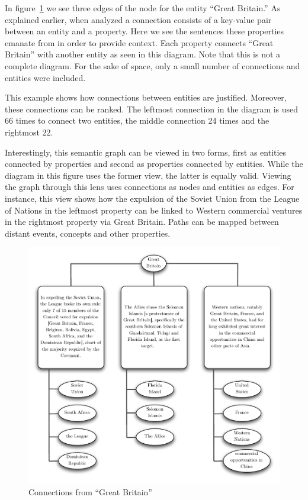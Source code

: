In figure~\ref{fig:gb-connections} we see three edges of the node for the entity ``Great Britain.''  As explained earlier, when analyzed a connection consists of a key-value pair between an entity and a property.  Here we see the sentences these properties emanate from in order to provide context.  Each property connects ``Great Britain'' with another entity as seen in this diagram.  Note that this is not a complete diagram.  For the sake of space, only a small number of connections and entities were included.

This example shows how connections between entities are justified.  Moreover, these connections can be ranked.  The leftmost connection in the diagram is used 66 times to connect two entities, the middle connection 24 times and the rightmost 22.

Interestingly, this semantic graph can be viewed in two forms, first as entities connected by properties and second as properties connected by entities.  While the diagram in this figure uses the former view, the latter is equally valid.  Viewing the graph through this lens uses connections as nodes and entities as edges.  For instance, this view shows how the expulsion of the Soviet Union from the League of Nations in the leftmost property can be linked to Western commercial ventures in the rightmost property via Great Britain.  Paths can be mapped between distant events, concepts and other properties.  

\begin{figure}
    \centering
    \includegraphics[width=\textwidth]{connection_diagram}
    \caption{Connections from ``Great Britain''}
    \label{fig:gb-connections}
\end{figure}

